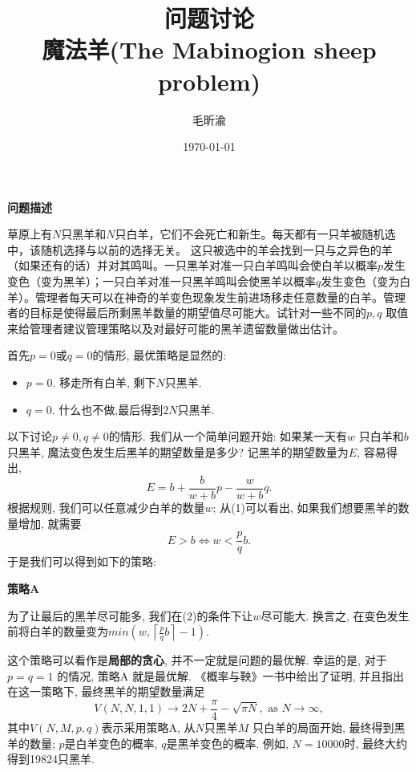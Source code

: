 \documentclass[11pt]{article}
\title{问题讨论\\魔法羊(The Mabinogion sheep problem)}
\author{毛昕渝}
\date{\today}
\begin{document}
\maketitle
\begin{tcolorbox}
\textbf{问题描述}

草原上有$N$只黑羊和$N$只白羊，它们不会死亡和新生。每天都有一只羊被随机选中，该随机选择与以前的选择无关。 这只被选中的羊会找到一只与之异色的羊（如果还有的话）并对其鸣叫。一只黑羊对准一只白羊鸣叫会使白羊以概率$p$发生变色（变为黑羊）；一只白羊对准一只黑羊鸣叫会使黑羊以概率$q$发生变色（变为白羊）。管理者每天可以在神奇的羊变色现象发生前进场移走任意数量的白羊。管理者的目标是使得最后所剩黑羊数量的期望值尽可能大。试针对一些不同的$p,q$ 取值来给管理者建议管理策略以及对最好可能的黑羊遗留数量做出估计。
\end{tcolorbox}

首先$p = 0$或$q = 0$的情形, 最优策略是显然的:
\begin{itemize}
  \item $p = 0$. 移走所有白羊, 剩下$N$只黑羊.
  \item $q = 0$. 什么也不做,最后得到$2N$只黑羊.
\end{itemize}

以下讨论$p \neq 0, q \neq 0$的情形. 我们从一个简单问题开始: 如果某一天有$w$ 只白羊和$b$只黑羊, 魔法变色发生后黑羊的期望数量是多少? 记黑羊的期望数量为$E$, 容易得出,
\begin{equation}
E = b + \frac{b}{w+b} p - \frac{w}{w + b}q.
\end{equation}
根据规则, 我们可以任意减少白羊的数量$w$; 从(1)可以看出, 如果我们想要黑羊的数量增加, 就需要
\begin{equation}
E > b \iff w < \frac{p}{q}b.
\end{equation}
于是我们可以得到如下的策略:
\vspace{0.5cm}
\begin{tcolorbox}
\textbf{策略A}

  为了让最后的黑羊尽可能多, 我们在(2)的条件下让$w$尽可能大. 换言之, 在变色发生前将白羊的数量变为$min(w,\left \lceil \frac{p}{q}b\right \rceil - 1)$.
\end{tcolorbox}
这个策略可以看作是\textbf{局部的贪心}, 并不一定就是问题的最优解. 幸运的是, 对于$p = q = 1$ 的情况, 策略A 就是最优解. 《概率与鞅》一书中给出了证明, 并且指出在这一策略下, 最终黑羊的期望数量满足
\begin{equation}
  V(N,N,1,1) \to 2N + \frac{\pi}{4} - \sqrt{\pi N}, \text{ as } N \to \infty,
\end{equation}
其中$V(N,M,p,q)$表示采用策略A, 从$N$只黑羊$M$ 只白羊的局面开始, 最终得到黑羊的数量; $p$是白羊变色的概率, $q$是黑羊变色的概率. 例如, $N = 10000$时, 最终大约得到19824只黑羊.
\end{document}
